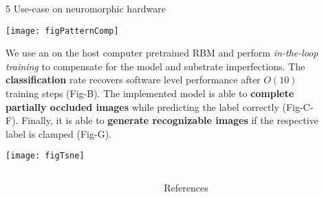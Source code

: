\begin{frame}
\begin{columns}
\begin{column}{0.99\textwidth}
\begin{columns}[t]
\begin{column}{0.32\textwidth}
\begin{block}{\large 5 Use-case on neuromorphic hardware}
					\thirdBlockImSpace
					\begin{center}
						\texttt{[image: figPatternComp]}
					\end{center}
					\thirdBlockImSpace


					\begin{adjustwidth}{1.cm}{1.cm}
					\justify
					We use an on the host computer pretrained RBM and perform \textit{in-the-loop training } to compensate for the model and substrate imperfections.
					The \textbf{classification} rate recovers software level performance after $O(10)$ training steps (Fig-B).
					The implemented model is able to \textbf{complete partially occluded images} while predicting the label correctly (Fig-C-F).
					Finally, it is able to \textbf{generate recognizable images} if the respective label is clamped (Fig-G).

					\end{adjustwidth}
					\thirdBlockImSpace
					\begin{center}
						\texttt{[image: figTsne]}
					\end{center}

					
					\blockSpaceTwo
					\end{block}


					\interBlockSpaceTwo




				\end{column}

				\begin{column}{.005\textwidth}\end{column}


			\end{columns}



		\end{column}
		\begin{column}{.005\textwidth}\end{column}
	\end{columns}

	\vspace{-1.0cm}

	\begin{columns}[t]
		\begin{column}{.01\textwidth}\end{column}

		\begin{column}{.98\textwidth}
			\begin{block}{References}
			 \begin{minipage}{0.79\linewidth}
								\tiny
								
								
			 \end{minipage}


\end{block}
\end{column}
\end{columns}
\end{frame}
